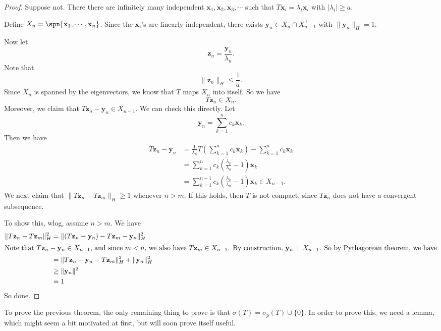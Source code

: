 \documentclass[a4paper]{article}
\begin{document}
\begin{proof}
  Suppose not. There there are infinitely many independent $\mathbf{x}_1, \mathbf{x}_2, \mathbf{x}_3, \cdots$ such that $T \mathbf{x}_i = \lambda_i \mathbf{x}_i$ with $|\lambda_i| \geq a$.

  Define $X_n = \spn\{\mathbf{x}_1, \cdots, \mathbf{x}_n\}$. Since the $\mathbf{x}_i$'s are linearly independent, there exists $\mathbf{y}_n \in X_n \cap X_{n - 1}^\perp$ with $\|\mathbf{y}_n\|_H = 1$.

  Now let
  \[
    \mathbf{z}_n = \frac{\mathbf{y}_n}{\lambda_n}.
  \]
  Note that
  \[
    \|\mathbf{z}_n\|_H \leq \frac{1}{a}.
  \]
  Since $X_n$ is spanned by the eigenvectors, we know that $T$ maps $X_n$ into itself. So we have
  \[
    T \mathbf{z}_n \in X_n.
  \]
  Moreover, we claim that $T \mathbf{z}_n - \mathbf{y}_n \in X_{n - 1}$. We can check this directly. Let
  \[
    \mathbf{y}_n = \sum_{k = 1}^n c_k \mathbf{x}_k.
  \]
  Then we have
  \begin{align*}
    T\mathbf{z}_n - \mathbf{y}_n &= \frac{1}{\lambda_n} T\left(\sum_{k = 1}^n c_k \mathbf{x}_k\right) - \sum_{k = 1}^n c_k \mathbf{x}_k\\
    &= \sum_{k = 1}^n c_k \left(\frac{\lambda_k}{\lambda_n} - 1\right) \mathbf{x}_k\\
    &= \sum_{k = 1}^{n - 1} c_k \left(\frac{\lambda_k}{\lambda_n} - 1\right) \mathbf{x}_k \in X_{n - 1}.
  \end{align*}
  We next claim that $\|T \mathbf{z}_n - T \mathbf{z}_m\|_H \geq 1$ whenever $n > m$. If this holds, then $T$ is not compact, since $T \mathbf{z}_n$ does not have a convergent subsequence.

  To show this, wlog, assume $n > m$. We have
  \begin{align*}
    \|T \mathbf{z}_n - T \mathbf{z}_m\|_H^2 &= \|(T \mathbf{z}_n - \mathbf{y}_n) - T \mathbf{z}_m - \mathbf{y}_n\|_H^2\\
    \intertext{Note that $T \mathbf{z}_n - \mathbf{y}_n \in X_{n - 1}$, and since $m < n$, we also have $T \mathbf{z}_m \in X_{n - 1}$. By construction, $\mathbf{y}_n \perp X_{n - 1}$. So by Pythagorean theorem, we have}
    &= \|T \mathbf{z}_n - \mathbf{y}_n - T \mathbf{z}_m\|_H^2 + \|\mathbf{y}_n\|_H^2\\
    &\geq \|\mathbf{y}_n\|^2\\
    &= 1
  \end{align*}
  So done.
\end{proof}

To prove the previous theorem, the only remaining thing to prove is that $\sigma(T) = \sigma_p(T) \cup \{0\}$. In order to prove this, we need a lemma, which might seem a bit motivated at first, but will soon prove itself useful.
\end{document}
